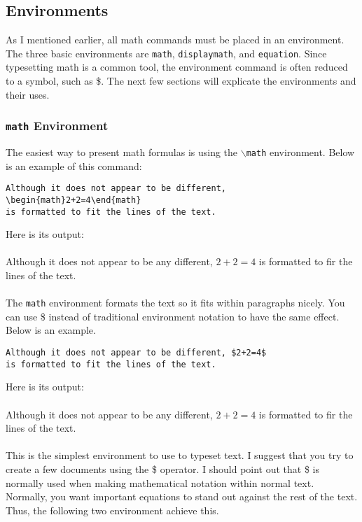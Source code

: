 \documentclass{article}
\begin{document}
\subsection{Environments}

As I mentioned earlier, all math commands must be placed in an environment. The three basic environments are \texttt{math}, \texttt{displaymath}, and \texttt{equation}. Since typesetting math is a common tool, the environment command is often reduced to a symbol, such as \$. The next few sections will explicate the environments and their uses.

\subsubsection{\texttt{math} Environment}

The easiest way to present math formulas is using the \texttt{$\backslash$math} environment. Below is an example of this command:
\begin{verbatim}
Although it does not appear to be different, \begin{math}2+2=4\end{math}
is formatted to fit the lines of the text.
\end{verbatim}
Here is its output: \\
\\
Although it does not appear to be any different, \begin{math}2+2=4\end{math} is formatted to fir the lines of the text.\\
\\
The \texttt{math} environment formats the text so it fits within paragraphs nicely. You can use \$ instead of traditional environment notation to have the same effect. Below is an example.
\begin{verbatim}
Although it does not appear to be different, $2+2=4$
is formatted to fit the lines of the text.
\end{verbatim}
Here is its output:\\
\\
Although it does not appear to be any different, $2+2=4$ is formatted to fir the lines of the text.\\
\\
This is the simplest environment to use to typeset text. I suggest that you try to create a few documents using the \$ operator. I should point out that \$ is normally used when making mathematical notation within normal text. Normally, you want important equations to stand out against the rest of the text. Thus, the following two environment achieve this.
\end{document}
